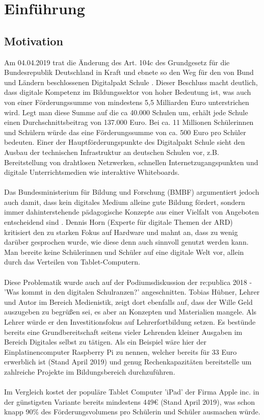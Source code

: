 \section{Einführung}\label{sec:einfuhrung}
\subsection{Motivation}\label{sec:motivation}

Am 04.04.2019 trat die Änderung des Art. 104c des Grundgesetz für die Bundesrepublik Deutschland in Kraft
und ebnete so den Weg für den von Bund und Ländern beschlossenen Digitalpakt Schule \cite{Art104cG55:online}. 
Dieser Beschluss macht deutlich, dass digitale Kompetenz im Bildungssektor von hoher Bedeutung ist, was auch von einer Förderungssumme von mindestens 5,5 Milliarden Euro unterstrichen wird. 
Legt man diese Summe auf die ca 40.000 Schulen um, erhält jede Schule einen Durchschnittsbeitrag von 137.000 Euro. Bei ca. 11 Millionen Schülerinnen und Schülern würde das eine Förderungssumme von ca. 500 Euro pro Schüler bedeuten. 
Einer der Hauptförderungspunkte des Digitalpakt Schule sieht den Ausbau der technischen Infrastruktur
an deutschen Schulen vor, z.B. Bereitstellung von drahtlosen Netzwerken, schnellen Internetzugangspunkten und digitale Unterrichtsmedien wie interaktive Whiteboards.
\\ \\
Das Bundesministerium für Bildung und Forschung (BMBF) argumentiert jedoch auch damit, dass kein digitales Medium alleine gute Bildung fördert, sondern immer dahinterstehende pädagogische Konzepte aus einer Vielfalt von Angeboten entscheidend sind \cite{BMBF2019}. Dennis Horn (Experte für digitale Themen der ARD) kritisiert den zu starken Fokus auf Hardware und mahnt an, dass zu wenig darüber gesprochen wurde, wie diese denn auch sinnvoll genutzt werden kann. Man bereite keine Schülerinnen und Schüler auf eine digitale Welt vor, allein durch das Verteilen von Tablet-Computern\cite{Horn2018}.
\\ \\
Diese Problematik wurde auch auf der Podiumsdiskussion der re:publica 2018 - 'Was kommt in den digitalen Schulranzen?' angeschnitten. Tobias Hübner, Lehrer und Autor im Bereich Medienistik, zeigt dort ebenfalls auf, dass der Wille Geld auszugeben zu begrüßen sei, es aber an Konzepten und Materialien mangele. Als Lehrer würde er den Investitionsfokus auf Lehrerfortbildung setzen.
Es bestünde bereits eine Grundbereitschaft seitens vieler Lehrenden kleiner Ausgaben im Bereich Digitales selbst zu tätigen. Als ein Beispiel wäre hier der Einplatinencomputer Raspberry Pi zu nennen, welcher bereits für 33 Euro erwerblich ist (Stand April 2019) und genug Rechenkapazitäten bereitstelle um zahlreiche Projekte im Bildungsbereich durchzuführen. 
\\ \\
Im Vergleich kostet der populäre Tablet Computer 'iPad' der Firma Apple inc. in der günstigsten Variante bereits mindestens 449€ \cite{iPadmini65:online} (Stand April 2019), was schon knapp 90\% des Förderungsvolumens pro Schülerin und Schüler ausmachen würde.
\\ \\  

